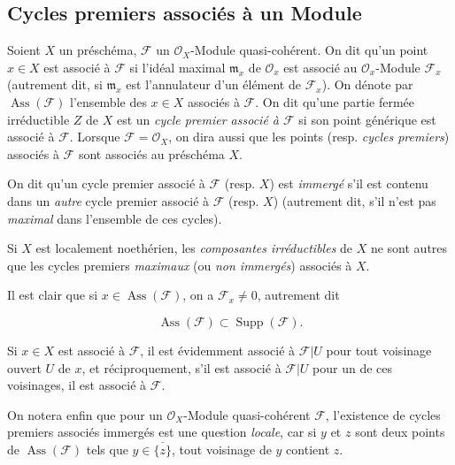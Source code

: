 \subsection{Cycles premiers associés à un Module}

\begin{definition}[3.1.1]
\label{IV.2.3.1.1-def-fr}
Soient $X$ un préschéma, $\mathcal F$ un $\mathcal O_X$-Module
quasi-cohérent. On dit qu'un point $x\in X$ est associé à $\mathcal F$ si
l'idéal maximal $\mathfrak m_x$ de $\mathcal O_x$ est associé au
$\mathcal O_x$-Module $\mathcal F_x$ (autrement dit, si $\mathfrak m_x$ est
l'annulateur d'un élément de $\mathcal F_x$). On dénote par
$\operatorname{Ass}(\mathcal F)$ l'ensemble des $x\in X$ associés à
$\mathcal F$. On dit qu'une partie fermée irréductible $Z$ de $X$ est un
\emph{cycle premier associé à $\mathcal F$} si son point générique est
associé à $\mathcal F$. Lorsque $\mathcal F=\mathcal O_X$, on dira aussi que
les points (resp. \emph{cycles premiers}) associés à $\mathcal F$ sont
associés au préschéma $X$.

On dit qu'un cycle premier associé à $\mathcal F$ (resp. $X$) est
\emph{immergé} s'il est contenu dans un \emph{autre} cycle premier associé à
$\mathcal F$ (resp. $X$) (autrement dit, s'il n'est pas \emph{maximal} dans
l'ensemble de ces cycles).
\end{definition}

Si $X$ est localement noethérien, les \emph{composantes irréductibles} de $X$
ne sont autres que les cycles premiers \emph{maximaux} (ou \emph{non immergés})
associés à $X$.

Il est clair que si $x\in\operatorname{Ass}(\mathcal F)$, on a
$\mathcal F_x\ne0$, autrement dit

\begin{env}[3.1.1.1]
\label{IV.2.3.1.1.1-fr}
\[
\operatorname{Ass}(\mathcal F)\subset\operatorname{Supp}(\mathcal F).
\]
\end{env}

Si $x\in X$ est associé à $\mathcal F$, il est évidemment associé à
$\mathcal F|U$ pour tout voisinage ouvert $U$ de $x$, et réciproquement, s'il
est associé à $\mathcal F|U$ pour un de ces voisinages, il est associé à
$\mathcal F$.

On notera enfin que pour un $\mathcal O_X$-Module quasi-cohérent $\mathcal F$,
l'existence de cycles premiers associés immergés est une question \emph{locale},
car si $y$ et $z$ sont deux points de $\operatorname{Ass}(\mathcal F)$ tels
que $y\in\overline{\{z\}}$, tout voisinage de $y$ contient $z$.

